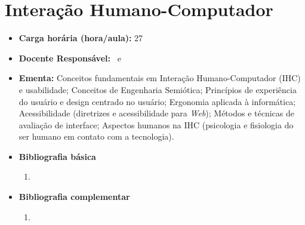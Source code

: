 \documentclass[11pt,fleqn]{book} %
\begin{document}
\section{Interação Humano-Computador}\label{4_ihc}
\begin{itemize}
	\item \textbf{Carga horária (hora/aula):} 27
	\item \textbf{Docente Responsável:}~ e ~
	\item \textbf{Ementa:} 
	Conceitos fundamentais em Interação Humano-Computador (IHC) e usabilidade;
	Conceitos de Engenharia Semiótica;
	Princípios de experiência do usuário e design centrado no usuário;
	Ergonomia aplicada à informática;
	Acessibilidade (diretrizes e acessibilidade para \textit{Web});
	Métodos e técnicas de avaliação de interface;
	Aspectos humanos na IHC (psicologia e fisiologia do ser humano em contato com a tecnologia).
	\item \textbf{Bibliografia básica}
	\begin{enumerate}
		\item ~\cite{Peirce1977}
	\end{enumerate}
	\item \textbf{Bibliografia complementar}
	\begin{enumerate}
		\item ~\cite{moreira1999teorias}
	\end{enumerate} 
\end{itemize}

\newpage
\end{document}
